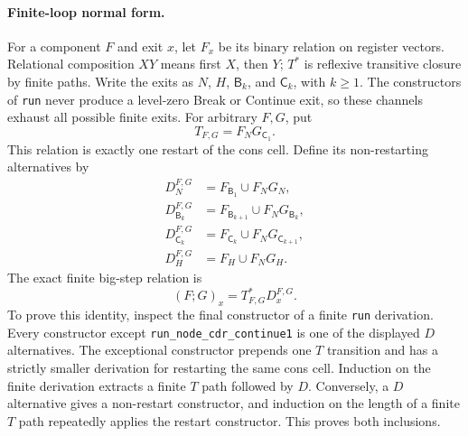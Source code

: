 \paragraph{Finite-loop normal form.}
For a component $F$ and exit $x$, let $F_x$ be its binary relation on
register vectors. Relational composition $XY$ means first $X$, then $Y$;
$T^*$ is reflexive transitive closure by finite paths. Write the exits as
$N$, $H$, $\mathsf B_k$, and $\mathsf C_k$, with $k\geq 1$.
The constructors of \texttt{run} never produce a level-zero Break or
Continue exit, so these channels exhaust all possible finite exits.
For arbitrary $F,G$, put
\[
 T_{F,G}=F_NG_{\mathsf C_1}.
\]
This relation is exactly one restart of the cons cell. Define its
non-restarting alternatives by
\begin{align*}
 D_N^{F,G}&=F_{\mathsf B_1}\cup F_NG_N,\\
 D_{\mathsf B_k}^{F,G}
   &=F_{\mathsf B_{k+1}}\cup F_NG_{\mathsf B_k},\\
 D_{\mathsf C_k}^{F,G}
   &=F_{\mathsf C_k}\cup F_NG_{\mathsf C_{k+1}},\\
 D_H^{F,G}&=F_H\cup F_NG_H.
\end{align*}
The exact finite big-step relation is
\begin{equation}
 (F;G)_x=T_{F,G}^*D_x^{F,G}.
 \label{eq:cons-finite-loop-normal-form}
\end{equation}
To prove this identity, inspect the final constructor of a finite
\texttt{run} derivation. Every constructor except
\texttt{run\_node\_cdr\_continue1} is one of the displayed $D$ alternatives.
The exceptional constructor prepends one $T$ transition and has a
strictly smaller derivation for restarting the same cons cell. Induction
on the finite derivation extracts a finite $T$ path followed by $D$.
Conversely, a $D$ alternative gives a non-restart constructor, and
induction on the length of a finite $T$ path repeatedly applies the
restart constructor. This proves both inclusions.

